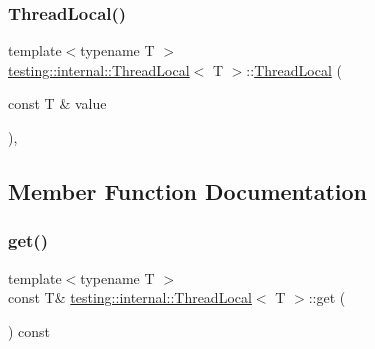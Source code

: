 \mbox{\label{classtesting_1_1internal_1_1ThreadLocal_a85610bdfdbc93a4c56215e0aad7da870}} 
\subsubsection{\texorpdfstring{ThreadLocal()}{ThreadLocal()}\hspace{0.1cm}{\footnotesize\ttfamily [2/2]}}
{\footnotesize\ttfamily template$<$typename T $>$ \\
\mbox{\hyperlink{classtesting_1_1internal_1_1ThreadLocal}{testing\+::internal\+::\+Thread\+Local}}$<$ T $>$\+::\mbox{\hyperlink{classtesting_1_1internal_1_1ThreadLocal}{Thread\+Local}} (\begin{DoxyParamCaption}\item[{const T \&}]{value }\end{DoxyParamCaption})\hspace{0.3cm}{\ttfamily [inline]}, {\ttfamily [explicit]}}



\subsection{Member Function Documentation}
\mbox{\label{classtesting_1_1internal_1_1ThreadLocal_ac56aeb97991824979bf192c63d1466f8}} 
\subsubsection{\texorpdfstring{get()}{get()}}
{\footnotesize\ttfamily template$<$typename T $>$ \\
const T\& \mbox{\hyperlink{classtesting_1_1internal_1_1ThreadLocal}{testing\+::internal\+::\+Thread\+Local}}$<$ T $>$\+::get (\begin{DoxyParamCaption}{ }\end{DoxyParamCaption}) const\hspace{0.3cm}{\ttfamily [inline]}}

